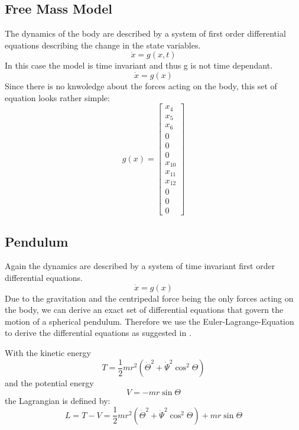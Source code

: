\subsection*{Free Mass Model}
The dynamics of the body are described by a system of first order differential equations describing the change in the state variables.
\begin{equation} \dot{x}=g(x,t)  \end{equation}
In this case the model is time invariant and thus g is not time dependant. 
\begin{equation} \dot{x}=g(x)  \end{equation}
Since there is no knwoledge about the forces acting on the body, this set of equation looks rather simple: 
\begin{equation} g(x)=\begin{bmatrix}  x_{4} \\  x_{5} \\ x_{6} \\ 0 \\ 0 \\ 0 \\ x_{10} \\ x_{11} \\ x_{12} \\ 0 \\ 0 \\0 \end{bmatrix} \end{equation}

\subsection*{Pendulum}
Again the dynamics are described by a system of time invariant first order differential equations. 
\begin{equation} \dot{x}=g(x)  \end{equation}
Due to the gravitation and the centripedal force being the only forces acting on the body, we can derive an exact set of differential equations that govern the motion of a spherical pendulum. Therefore we use the Euler-Lagrange-Equation to derive the differential equations as suggested in \cite[156ff]{debnath2005}.

With the kinetic energy
\begin{equation} T=\frac{1}{2}mr^2(\dot{\Theta}^2+\dot{\Psi}^2\cos^2{\Theta})  \end{equation}
and the potential energy
\begin{equation} V=-mr\sin{\Theta}  \end{equation}
the Lagrangian is defined by:
\begin{equation} L=T-V = \frac{1}{2}mr^2(\dot{\Theta}^2+\dot{\Psi}^2\cos^2{\Theta})+mr\sin{\Theta}\end{equation}

